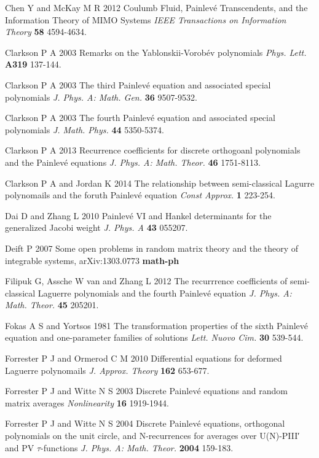 \documentclass[12pt]{article}
\def\P{Painlev\'e }
\numberwithin{figure}{section}
\numberwithin{equation}{section}
\numberwithin{table}{section}
\begin{document}
\begin{thebibliography}{9}
  {Chen Y and McKay M R} 2012 Coulumb Fluid, \P Transcendents, and the
  Information Theory of MIMO Systems {\it{IEEE Transactions on Information Theory}} {\bf{58}} 4594-4634.

  {Clarkson P A} 2003 {Remarks on the Yablonskii-Vorob\'ev polynomials} {\it{Phys. Lett.}}
  {\bf{A319}} 137-144.

  {Clarkson P A} 2003 {The third \P equation and associated special polynomials} {\it{J. Phys. A: Math. Gen.}}
  {\bf{36}} 9507-9532.

  {Clarkson P A} 2003 {The fourth \P equation and associated special polynomials} {\it{J. Math. Phys.}}
  {\bf{44}} 5350-5374.

  {Clarkson P A} 2013 {Recurrence coefficients for discrete orthogoanl polynomials and the Painlev\'e equations} {\it{J. Phys. A: Math. Theor.}} {\bf{46}} 1751-8113.

  {Clarkson P A and Jordan K} 2014 {The relationship between semi-classical Lagurre polynomails and the foruth \P equation}  {\it{Const Approx}}. {\bf{1}} 223-254.

  {Dai D and Zhang L} 2010 {\P VI and Hankel determinants for the generalized Jacobi weight}
   {\it{J. Phys. A}} {\bf{43}} 055207.

  {Deift P} 2007 {Some open problems in random matrix theory and
the theory of integrable systems}, arXiv:1303.0773 {\bf{math-ph}}

  {Filipuk G, Assche W van and Zhang L} 2012 {The recurrrence coefficients of semi-classical Laguerre polynomials and the fourth Painlev\'e
  equation} {\it{J. Phys. A: Math. Theor.}} {\bf{45}} 205201.

  {Fokas A S and Yortsos} 1981 {The transformation properties of the sixth
\P equation and one-parameter families of solutions} {\it{Lett. Nuovo Cim.}} {\bf{30}} 539-544.

  {Forrester P J and Ormerod C M} 2010 {Differential equations for deformed Laguerre polynomails} {\it{J. Approx. Theory}} {\bf{162}} 653-677.

  {Forrester P J and Witte N S} 2003 Discrete \P equations and random matrix averages {\it{Nonlinearity}} {\bf{16}} 1919-1944.

  {Forrester P J and Witte N S} 2004 {Discrete \P equations, orthogonal polynomials on the unit circle, and N-recurrences for averages
  over U(N)-PIII′ and PV $\tau$-functions} {\it{J. Phys. A: Math. Theor.}} {\bf{2004}} 159-183.


\end{thebibliography}
\end{document}
